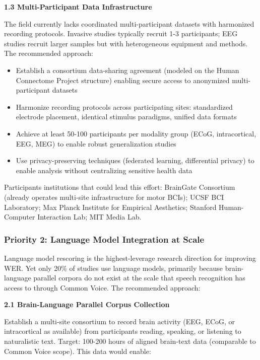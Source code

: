\textbf{1.3 Multi-Participant Data Infrastructure}

The field currently lacks coordinated multi-participant datasets with harmonized recording protocols. Invasive studies typically recruit 1-3 participants; EEG studies recruit larger samples but with heterogeneous equipment and methods. The recommended approach:

\begin{itemize}
    \item Establish a consortium data-sharing agreement (modeled on the Human Connectome Project structure) enabling secure access to anonymized multi-participant datasets
    \item Harmonize recording protocols across participating sites: standardized electrode placement, identical stimulus paradigms, unified data formats
    \item Achieve at least 50-100 participants per modality group (ECoG, intracortical, EEG, MEG) to enable robust generalization studies
    \item Use privacy-preserving techniques (federated learning, differential privacy) to enable analysis without centralizing sensitive health data
\end{itemize}

Participants institutions that could lead this effort: BrainGate Consortium (already operates multi-site infrastructure for motor BCIs); UCSF BCI Laboratory; Max Planck Institute for Empirical Aesthetics; Stanford Human-Computer Interaction Lab; MIT Media Lab.

\subsubsection{Priority 2: Language Model Integration at Scale}

Language model rescoring is the highest-leverage research direction for improving WER. Yet only 20\% of studies use language models, primarily because brain-language parallel corpora do not exist at the scale that speech recognition has access to through Common Voice. The recommended approach:

\textbf{2.1 Brain-Language Parallel Corpus Collection}

Establish a multi-site consortium to record brain activity (EEG, ECoG, or intracortical as available) from participants reading, speaking, or listening to naturalistic text. Target: 100-200 hours of aligned brain-text data (comparable to Common Voice scope). This data would enable:


